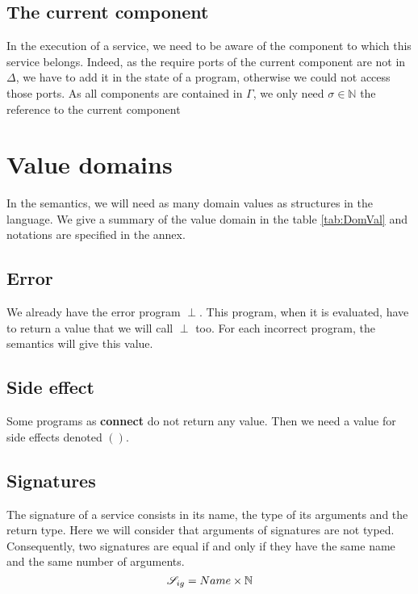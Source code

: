 \subsection{The current component}
In the execution of a service, we need to be aware of the component to which this service belongs. Indeed, as the require ports of the current component are not in $\Delta$, we have to add it in the state of a program, otherwise we could not access those ports. As all components are contained in $\Gamma$, we only need $\sigma \in \mathbb{N}$ the reference to the current component






\section{Value domains}
In the semantics, we will need as many domain values as structures in the language. We give a summary of the value domain in the table  \ref{tab:DomVal} and notations are specified in the annex.

\subsection{Error}
We already have the error program $\perp$. This program, when it is evaluated, have to return a value that we will call $\perp$ too. For each incorrect program, the semantics will give this value.

\subsection{Side effect}
Some programs as \textbf{connect} do not return any value. Then we need a value for side effects denoted $()$.

\subsection{Signatures}
The signature of a service consists in its name, the type of its arguments and the return type.
Here we will consider that arguments of signatures are not typed. Consequently, two signatures are equal if and only if they have the same name and the same number of arguments. 
\[\mathcal{S}_{ig} = Name \times \mathbb{N}\]

